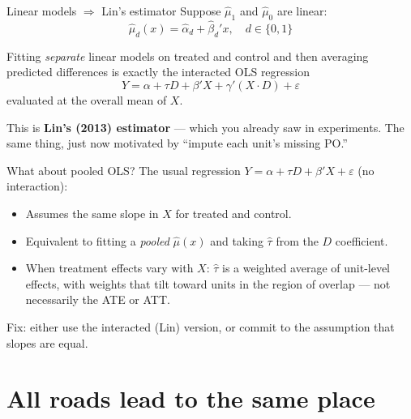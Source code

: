 \documentclass[xcolor=dvipsnames]{beamer}
\begin{document}
\begin{frame}{Linear models $\Rightarrow$ Lin's estimator}
\small
{} Suppose $\widehat{\mu}_1$ and $\widehat{\mu}_0$ are linear:
$$\widehat{\mu}_d(x) = \widehat{\alpha}_d + \widehat{\beta}_d' x, \quad d \in \{0, 1\}$$

\bigskip
{} Fitting \emph{separate} linear models on treated and control and then averaging predicted differences is exactly the interacted OLS regression
$$Y = \alpha + \tau D + \beta' X + \gamma'(X \cdot D) + \varepsilon$$
evaluated at the overall mean of $X$.

\bigskip
{} This is \textbf{Lin's (2013) estimator} --- which you already saw in experiments.  The same thing, just now motivated by ``impute each unit's missing PO.''
\end{frame}


\begin{frame}{What about pooled OLS?}
\small
{} The usual regression $Y = \alpha + \tau D + \beta' X + \varepsilon$ (no interaction):
\begin{itemize}
\footnotesize
\item<2-> Assumes the same slope in $X$ for treated and control.
\item<3-> Equivalent to fitting a \emph{pooled} $\widehat{\mu}(x)$ and taking $\widehat{\tau}$ from the $D$ coefficient.
\item<4-> When treatment effects vary with $X$: $\widehat{\tau}$ is a weighted average of unit-level effects, with weights that tilt toward units in the region of overlap --- not necessarily the ATE or ATT.
\end{itemize}
\small
\bigskip
{} Fix: either use the interacted (Lin) version, or commit to the assumption that slopes are equal.
\end{frame}


\section{All roads lead to the same place}
\end{document}
